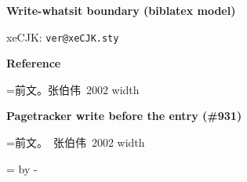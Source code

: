 \documentclass{article}
\makeatletter
\newcommand\pkgversion{\csname ver@xeCJK.sty\endcsname}
\def\blx@pagetracker{%
  \protected@write\bibaux{}{\string\abx@aux@page{1}{\the\c@page}}}
\makeatother
\begin{document}
{\Large\bfseries Write-whatsit boundary (biblatex model)}\par
xeCJK: \texttt{\pkgversion}

\medskip\textbf{Reference}\par
{}=\hbox{前文。张伯伟 2002}
\quad width \the{}

\medskip\textbf{Pagetracker write before the entry (\#931)}\par
\makeatletter
{}=\hbox{前文。\blx@pagetracker 张伯伟 2002}
\makeatother
{}\quad width \the{}\par
{}= \advance{} by -
\ifdim\dimen0=0pt\textcolor{teal}{same width: no spurious glue}\else
  \textcolor{red}{difference: \the\dimen0}\fi
\end{document}
